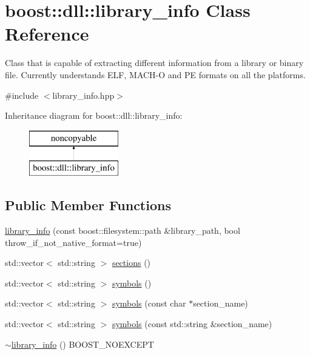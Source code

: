 \hypertarget{a00192}{}\section{boost\+:\+:dll\+:\+:library\+\_\+info Class Reference}
\label{a00192}


Class that is capable of extracting different information from a library or binary file. Currently understands E\+LF, M\+A\+C\+H-\/O and PE formats on all the platforms.  




{\ttfamily \#include $<$library\+\_\+info.\+hpp$>$}

Inheritance diagram for boost\+:\+:dll\+:\+:library\+\_\+info\+:\begin{figure}[H]
\begin{center}
\leavevmode
\includegraphics[height=2.000000cm]{a00192}
\end{center}
\end{figure}
\subsection*{Public Member Functions}
\begin{DoxyCompactItemize}
\item 
\hyperlink{a00192_a32c4471296054be76f69deeec9be1c71}{library\+\_\+info} (const boost\+::filesystem\+::path \&library\+\_\+path, bool throw\+\_\+if\+\_\+not\+\_\+native\+\_\+format=true)
\item 
std\+::vector$<$ std\+::string $>$ \hyperlink{a00192_a0463e65b15beaa6843af435464f28019}{sections} ()
\item 
std\+::vector$<$ std\+::string $>$ \hyperlink{a00192_ac033e17288e07d38f3b725a598908a01}{symbols} ()
\item 
std\+::vector$<$ std\+::string $>$ \hyperlink{a00192_a89875161fa1edb4b95aa80380b471436}{symbols} (const char $\ast$section\+\_\+name)
\item 
std\+::vector$<$ std\+::string $>$ \hyperlink{a00192_ac6bac9eeab1e0ac0202172d61302045b}{symbols} (const std\+::string \&section\+\_\+name)
\item 
\hyperlink{a00192_aef1b6b0e24ced9b03ba67569ec636074}{$\sim$library\+\_\+info} () B\+O\+O\+S\+T\+\_\+\+N\+O\+E\+X\+C\+E\+PT
\end{DoxyCompactItemize}


